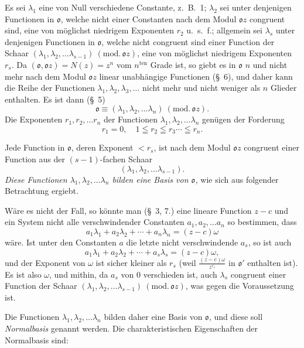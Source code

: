 \documentclass{article}
\begin{document}
Es sei $\lambda_{1}$ eine von Null verschiedene Constante, z.\ B.\ 1; $\lambda_{2}$ sei unter denjenigen Functionen in $\mathfrak{o}$, welche nicht einer Constanten nach dem Modul $\mathfrak{o}z$ congruent sind, eine von möglichst niedrigem Exponenten $r_{2}$ u.\ s.\ f.; allgemein sei $\lambda_{s}$ unter denjenigen Functionen in $\mathfrak{o}$, welche nicht congruent sind einer Function der Schaar $(\lambda_{1}, \lambda_{2}, \ldots \lambda_{s-1})\ (\text{mod.}\,\mathfrak{o}z)$, eine von möglichst niedrigem Exponenten $r_{s}$. Da $(\mathfrak{o}, \mathfrak{o}z) = N(z) = z^{n}$ vom $n^{\text{ten}}$ Grade ist, so giebt es in $\mathfrak{o}$ $n$ und nicht mehr nach dem Modul $\mathfrak{o}z$ linear unabhängige Functionen (§~6), und daher kann die Reihe der Functionen $\lambda_{1}, \lambda_{2}, \lambda_{3}, \ldots$ nicht mehr und nicht weniger als $n$ Glieder enthalten. Es ist dann (§~5)
\[ \mathfrak{o} \equiv (\lambda_{1}, \lambda_{2}, \ldots \lambda_{n})\ (\text{mod.}\,\mathfrak{o}z). \]
Die Exponenten $r_{1}, r_{2}, \ldots r_{n}$ der Functionen $\lambda_{1}, \lambda_{2}, \ldots \lambda_{n}$ genügen der Forderung
\[ r_{1} = 0, \quad 1 \leqq r_{2} \leqq r_{3} \cdots \leqq r_{n}. \]

Jede Function in $\mathfrak{o}$, deren Exponent $< r_{s}$, ist nach dem Modul $\mathfrak{o}z$ congruent einer Function aus der $(s-1)$-fachen Schaar
\[ (\lambda_{1}, \lambda_{2}, \ldots \lambda_{s-1}). \]
\emph{Diese Functionen $\lambda_{1}, \lambda_{2}, \ldots \lambda_{n}$ bilden eine Basis von $\mathfrak{o}$,} wie sich aus folgender Betrachtung ergiebt.

Wäre es nicht der Fall, so könnte man (§~3, 7.) eine lineare Function $z-c$ und ein System nicht alle verschwindender Constanten $a_{1}, a_{2}, \ldots a_{n}$ so bestimmen, dass
\[ a_{1}\lambda_{1} + a_{2}\lambda_{2} + \cdots + a_{n}\lambda_{n} = (z-c)\omega \]
wäre. Ist unter den Constanten $a$ die letzte nicht verschwindende $a_{s}$, so ist auch
\[ a_{1}\lambda_{1} + a_{2}\lambda_{2} + \cdots + a_{s}\lambda_{s} = (z-c)\omega, \]
und der Exponent von $\omega$ ist sicher kleiner als $r_{s}$ (weil $\frac{(z-c)\omega}{z^{r_{s}}}$ in $\mathfrak{o}'$ enthalten ist). Es ist also $\omega$, und mithin, da $a_{s}$ von 0 verschieden ist, auch $\lambda_{s}$ congruent einer Function der Schaar $(\lambda_{1}, \lambda_{2}, \ldots \lambda_{s-1})\ (\text{mod.}\,\mathfrak{o}z)$, was gegen die Voraussetzung ist.

Die Functionen $\lambda_{1}, \lambda_{2}, \ldots \lambda_{n}$ bilden daher eine Basis von $\mathfrak{o}$, und diese soll \emph{Normalbasis} genannt werden. Die charakteristischen Eigenschaften der Normalbasis sind:
\end{document}
